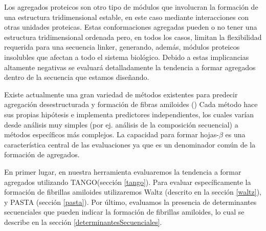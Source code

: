Los agregados proteicos son otro tipo de módulos que involucran la formación de una estructura tridimensional estable, en este caso mediante interacciones con otras unidades proteicas.
Estas conformaciones agregadas pueden o no tener una estructura tridimensional ordenada pero, en todos los casos, limitan la flexibilidad requerida para una secuencia linker, generando, además,
módulos proteicos insolubles que afectan a todo el sistema biológico.
Debido a estas implicancias altamente negativas se evaluará detalladamente la tendencia a formar agregados dentro de la secuencia que estamos diseñando.
 

Existe actualmente una gran variedad de métodos existentes para predecir agregación desestructurada y formación de fibras amiloides (\cite{hamodrakas2011protein,redler2014computational,agrawal2011aggregation})
Cada método hace sus propias hipótesis e implementa predictores independientes, los cuales varían desde análisis muy simples (por ej. análisis de la composición secuencial) a métodos específicos más complejos.
La capacidad para formar hojas-$\beta$ es una característica central de las evaluaciones ya que es un denominador común de la formación de agregados.

En primer lugar, en nuestra herramienta evaluaremos la tendencia a formar agregados utilizando TANGO(sección \ref{tango}). 
Para evaluar específicamente la formación de fibrillas amiloides utilizaremos Waltz (descrito en la sección \ref{waltz}), y PASTA (sección \ref{pasta}).
Por último, evaluamos la presencia de determinantes secuenciales que pueden indicar la formación de fibrillas amiloides, lo cual se describe en la sección \ref{determinantesSecuenciales}.




















